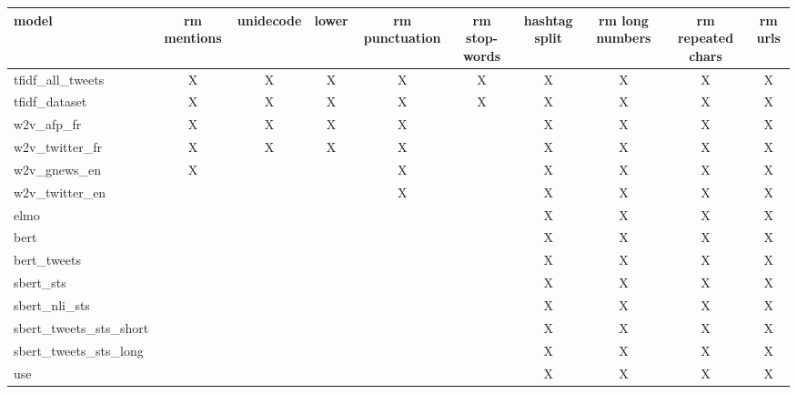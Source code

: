 \begin{tabular}{lccccccccc}
\hline
                  model & rm mentions & unidecode & lower & rm punctuation & rm stop-words & hashtag split & rm long numbers & rm repeated chars & rm urls \\
\hline
       tfidf\_all\_tweets &           X &         X &     X &              X &             X &             X &               X &                 X &       X \\
          tfidf\_dataset &           X &         X &     X &              X &             X &             X &               X &                 X &       X \\
             w2v\_afp\_fr &           X &         X &     X &              X &               &             X &               X &                 X &       X \\
         w2v\_twitter\_fr &           X &         X &     X &              X &               &             X &               X &                 X &       X \\
           w2v\_gnews\_en &           X &           &       &              X &               &             X &               X &                 X &       X \\
         w2v\_twitter\_en &             &           &       &              X &               &             X &               X &                 X &       X \\
                   elmo &             &           &       &                &               &             X &               X &                 X &       X \\
                   bert &             &           &       &                &               &             X &               X &                 X &       X \\
            bert\_tweets &             &           &       &                &               &             X &               X &                 X &       X \\
              sbert\_sts &             &           &       &                &               &             X &               X &                 X &       X \\
          sbert\_nli\_sts &             &           &       &                &               &             X &               X &                 X &       X \\
 sbert\_tweets\_sts\_short &             &           &       &                &               &             X &               X &                 X &       X \\
  sbert\_tweets\_sts\_long &             &           &       &                &               &             X &               X &                 X &       X \\
                    use &             &           &       &                &               &             X &               X &                 X &       X \\
\hline
\end{tabular}
